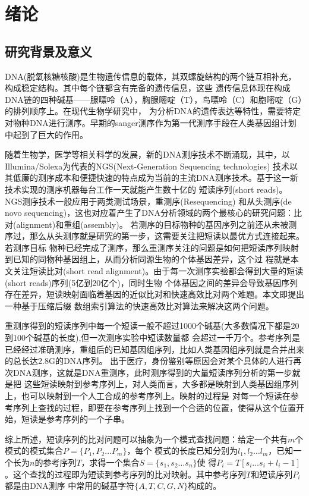 \chapter{绪论}
\label{chap:introduction}

\section{研究背景及意义}

DNA(脱氧核糖核酸)是生物遗传信息的载体，其双螺旋结构的两个链互相补充，构成稳定结构。其中每个链都含有完备的遗传信息，这些
遗传信息体现在构成DNA链的四种碱基——腺嘌呤（A），胸腺嘧啶（T），鸟嘌呤（C）和胞嘧啶（G）的排列顺序上。在现代生物学研究中，
为分析DNA的遗传表达等特性，需要特定对物种DNA进行测序。早期的sanger测序作为第一代测序手段在人类基因组计划中起到了巨大的作用。

随着生物学，医学等相关科学的发展，新的DNA测序技术不断涌现，其中，以Illumina/Solexa为代表的NGS(Next-Generation Sequencing technologies)
技术以其低廉的测序成本和便捷快速的特点成为当前的主流DNA测序技术。基于这一新技术实现的测序机器每台工作一天就能产生数十亿的
短读序列(short reads)\cite{metzker2009sequencing}。NGS测序技术一般应用于两类测试场景，重测序(Resequencing)
和从头测序(de novo sequencing)，这也对应着产生了DNA分析领域的两个最核心的研究问题：比对(alignment)和重组(assembly)。
若测序的目标物种的基因序列之前还从未被测序过，那么从头测序就是研究的第一步，这需要关注把短读以最优方式连接起来。若测序目标
物种已经完成了测序，那么重测序关注的问题是如何把短读序列映射到已知的同物种基因组上，从而分析同源生物的个体基因差异，这个过
程就是本文关注短读比对(short read alignment)。由于每一次测序实验都会得到大量的短读(short reads)序列(5亿到20亿个)，同时生物
个体基因之间的差异会导致基因序列存在差异，短读映射面临着基因的近似比对和快速高效比对两个难题。本文即提出一种基于压缩后缀
数组索引算法的快速高效比对算法来解决这两个问题。

重测序得到的短读序列中每一个短读一般不超过1000个碱基(大多数情况下都是20到100个碱基的长度),但一次测序实验中短读数量都
会超过一千万个。参考序列是已经经过准确测序，重组后的已知基因组序列，比如人类基因组序列就是合并出来的总长达2.8G的DNA序列。
出于医疗，身份鉴别等原因会对某个具体的人进行再次DNA测序，这就是DNA重测序，此时测序得到的大量短读序列分析的第一步就是把
这些短读映射到参考序列上，对人类而言，大多都是映射到人类基因组序列上，也可以映射到一个人工合成的参考序列上。映射的过程是
对每一个短读在参考序列上查找的过程，即要在参考序列上找到一个合适的位置，使得从这个位置开始，短读是参考序列的一个子串。

综上所述，短读序列的比对问题可以抽象为一个模式查找问题：给定一个共有$m$个模式的模式集合$P=\{P_1,P_2\ldots P_m\}$，每个
模式的长度已知分别为$l_1,l_2\ldots l_m$，已知一个长为$n$的参考序列$T$，求得一个集合$S=\{s_1,s_2\ldots s_n\}$使
得$P_i=T[s_i\ldots s_i+l_i-1]$。这个查找的过程即为短读到参考序列的比对映射。其中参考序列$T$和短读序列$P_i$都是由DNA测序
中常用的碱基字符$\{A,T,C,G,N\}$构成的。

